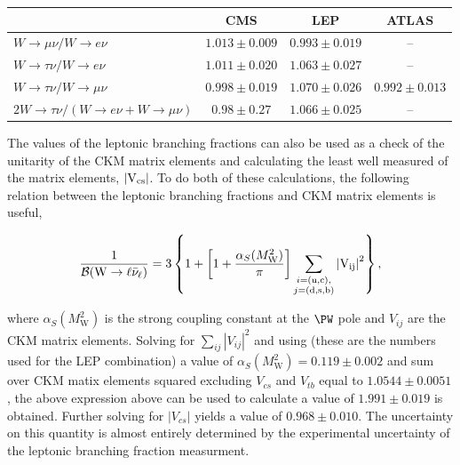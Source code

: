 \begin{table}[htb!]
    \centering
    \begin{tabular}{l|ccc}
                                                                                               & CMS               & LEP               & ATLAS              \\
    \hline                                                                 
    $W\rightarrow \mu\nu / W\rightarrow e\nu$                                                  & $1.013 \pm 0.009$ & $0.993 \pm 0.019$ & --                 \\
    $W\rightarrow \tau\nu / W\rightarrow e\nu$                                                 & $1.011 \pm 0.020$ & $1.063 \pm 0.027$ & --                 \\
    $W\rightarrow \tau\nu / W\rightarrow \mu\nu$                                               & $0.998 \pm 0.019$ & $1.070 \pm 0.026$ & $0.992 \pm 0.013$  \\
    $2 W \rightarrow \tau\nu /(W\rightarrow e\nu + W\rightarrow \mu\nu)$                       & $0.98 \pm 0.27$   & $1.066 \pm 0.025$ & --                 \\
    \end{tabular}
\end{table}

The values of the leptonic branching fractions can also be used as a
check of the unitarity of the CKM matrix elements and calculating the
least well measured of the matrix elements, $\left|\rm V_{cs}\right|$.
To do both of these calculations, the following relation between the
leptonic branching fractions and CKM matrix elements is useful, 

\begin{equation}
    \frac{1}{\mathcal{B}(\mathrm{W} \rightarrow \ell\bar{\nu}_{\ell})} =
    3\left\{1 + \left[1 + \frac{\alpha_{S}(M^{2}_{\mathrm{W}})}{\pi}\right]
    \sum_{\substack{i = (\mathrm{u,c}), \\ j=(\mathrm{d, s,
    b})}}\left|\rm V_{ij}\right|^{2}\right\},
\end{equation}

where $\alpha_{S}(M^{2}_{\mathrm{W}})$ is the strong coupling constant
at the $\PW$ pole and $V_{ij}$ are the CKM matrix elements.  Solving for
$\sum_{ij}\left|V_{ij}\right|^{2}$ and using (these are the numbers used
for the LEP combination) a value of $\alpha_{S}(M^{2}_{\mathrm{W}}) =
0.119 \pm 0.002$ and sum over CKM matix elements squared excluding
$V_{cs}$ and $V_{tb}$ equal to $1.0544 \pm 0.0051$, the above expression
above can be used to calculate a value of $1.991 \pm 0.019$ is obtained.
Further solving for $\left|V_{cs}\right|$ yields a value of $0.968 \pm
0.010$.  The uncertainty on this quantity is almost entirely determined
by the experimental uncertainty of the leptonic branching fraction
measurment.






